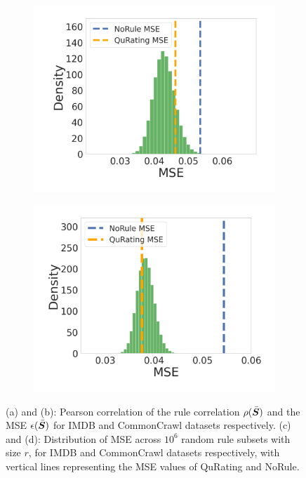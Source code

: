 \documentclass{article}
\newcommand{\bmS}{\bar{\mS}}
\begin{document}
\begin{figure}[h]
\begin{subfigure}[b]{0.23\linewidth}
    \caption{}
    \label{fig:EvalA_CommonCrawl_Pairwise_pearson}
\end{subfigure}
\begin{subfigure}[b]{0.22\linewidth}
    \centering
    \includegraphics[width=\linewidth]{figures/EvalA_IMDB_Pairwise_histogram.pdf}
    \caption{}
    \label{fig:EvalA_IMDB_Pairwise_histogram}
\end{subfigure}
\begin{subfigure}[b]{0.23\linewidth}
    \centering
    \includegraphics[width=\linewidth]{figures/EvalA_CommonCrawl_Pairwise_histogram.pdf}
    \caption{}
    \label{fig:EvalA_CommonCrawl_Pairwise_histogram}
\end{subfigure}
\caption{(a) and (b): Pearson correlation of the rule correlation $\rho(\bmS)$ and the MSE $\epsilon(\bmS)$ for IMDB and CommonCrawl datasets respectively. (c) and (d): Distribution of MSE across $10^6$ random rule subsets with size $r$, for IMDB and CommonCrawl datasets respectively, with vertical lines representing the MSE values of QuRating and NoRule.}
\end{figure}
\end{document}
